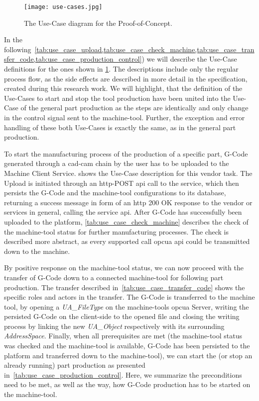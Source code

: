\documentclass[
a4paper,
twoside,
headsepline,
cleardoublepage=empty,
parskip=half,
draft=false
]{scrbook}
\begin{document}
				\begin{figure}[htbp]
					\centering
					\texttt{[image: use-cases.jpg]}
					\caption{The Use-Case diagram for the Proof-of-Concept.}
					\label{fig:use_cases}
				\end{figure}

				In the following~\cref{tab:use_case_upload,tab:use_case_check_machine,tab:use_case_transfer_code,tab:use_case_production_control}) we will describe the Use-Case definitions for the ones shown in \cref{fig:use_cases}. The descriptions include only the regular process flow, as the side effects are described in more detail in the specification, created during this research work. We will highlight, that the definition of the Use-Cases to start and stop the tool production have been united into the Use-Case of the general part production as the steps are identically and only change in the control signal sent to the machine-tool. Further, the exception and error handling of these both Use-Cases is exactly the same, as in the general part production.
				
				To start the manufacturing process of the production of a specific part, G-Code generated through a \gls{cad}-\gls{cam} chain by the user has to be uploaded to the Machine Client Service.  shows the Use-Case description for this vendor task. The Upload is initiated through an \gls{http}-POST \gls{api} call to the service, which then persists the G-Code and the machine-tool configurations to its database, returning a success message in form of an \gls{http} 200 OK response to the vendor or services in general, calling the service \gls{api}.
				After G-Code has successfully been uploaded to the platform, \cref{tab:use_case_check_machine} describes the check of the machine-tool status for further manufacturing processes. The check is described more abstract, as every supported call \gls{opcua} \gls{api} could be transmitted down to the machine.
				
				By positive response on the machine-tool status, we can now proceed with the transfer of G-Code down to a connected machine-tool for following part production. The transfer described in~\cref{tab:use_case_transfer_code} shows the specific roles and actors in the transfer. The G-Code is transferred to the machine tool, by opening a \textit{UA\_FileType} on the machine-tools \gls{opcua} Server, writing the persisted G-Code on the client-side to the opened file and closing the writing process by linking the new \textit{UA\_Object} respectively with its surrounding \textit{AddressSpace}.
				Finally, when all prerequisites are met (the machine-tool status was checked and the machine-tool is available, G-Code has been persisted to the platform and transferred down to the machine-tool), we can start the (or stop an already running) part production as presented in~\cref{tab:use_case_production_control}. Here, we summarize the preconditions need to be met, as well as the way, how G-Code production has to be started on the machine-tool.
				
\end{document}
